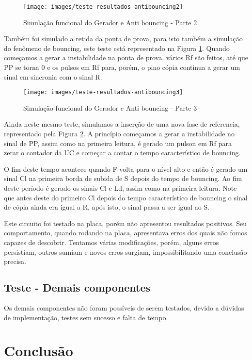 \documentclass[12pt,a4paper,openany]{abntex2}
\begin{document}
\begin{figure}[!htp]
	\centering
	\caption{Simulação funcional do Gerador e Anti bouncing - Parte 2}
	\texttt{[image: images/teste-resultados-antibouncing2]}	\label{fig:teste-resultados-antibouncing2}
\end{figure}

Também foi simulado a retida da ponta de prova, para isto também a simulação do fenômeno de bouncing, este teste está representado na Figura \ref{fig:teste-resultados-antibouncing2}. Quando começamos a gerar a instabilidade na ponta de prova, vários Rf são feitos, até que PP se torna 0 e os pulsos em Rf para, porém, o pino cópia continua a gerar um sinal em sincronia com o sinal R.

\begin{figure}[!htp]
	\centering
	\caption{Simulação funcional do Gerador e Anti bouncing - Parte 3}
	\texttt{[image: images/teste-resultados-antibouncing3]}	\label{fig:teste-resultados-antibouncing3}
\end{figure}

Ainda neste mesmo teste, simulamos a inserção de uma nova fase de referencia, representado pela Figura \ref{fig:teste-resultados-antibouncing3}. A princípio começamos a gerar a instabilidade no sinal de PP, assim como na primeira leitura, é gerado um pulson em Rf para zerar o contador da UC e começar a contar o tempo característico de bouncing. 

O fim deste tempo acontece quando F volta para o nível alto e então é gerado um sinal Cl na primeira borda de subida de S depois do tempo de bouncing. Ao fim deste período é gerado os sinais Cl e Ld, assim como na primeira leitura. Note que antes deste do primeiro Cl depois do tempo característico de bouncing o sinal de cópia ainda era igual a R, após isto, o sinal passa a ser igual ao S.

Este circuito foi testado na placa, porém não apresentou resultados positivos. Seu comportamento, quando rodando na placa, apresentava erros dos quais não fomos capazes de descobrir. Tentamos várias modificações, porém, alguns erros persistiam, outros sumiam e novos erros surgiam, impossibilitando uma conclusão precisa.

\section{Teste - Demais componentes}

Os demais componentes não foram possíveis de serem testados, devido a dúvidas de implementação, testes sem sucesso e falta de tempo.

\chapter{Conclusão}
\end{document}
